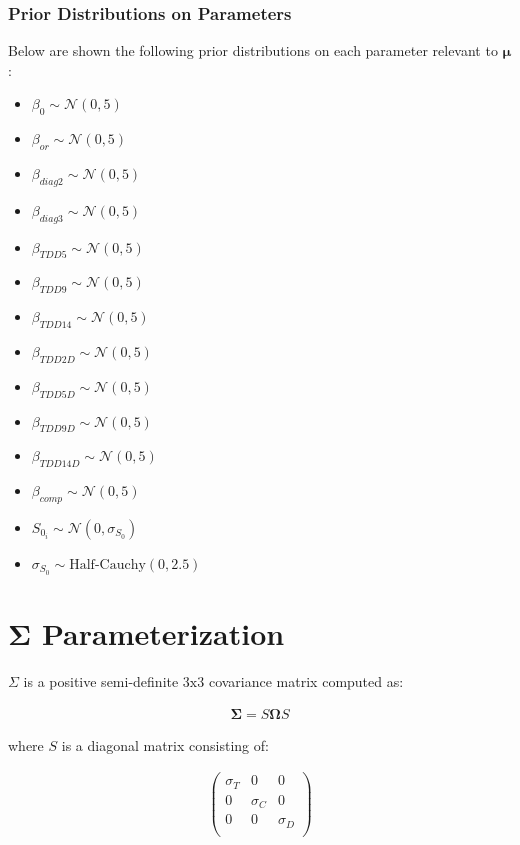 \subsubsection{Prior Distributions on Parameters}
Below are shown the following prior distributions on each parameter relevant to $\boldsymbol{\mu}$:
\begin{itemize}
    \item $\beta_{0} \sim \mathcal{N}(0,5)$
    \item $\beta_{or} \sim \mathcal{N}(0,5)$
    \item $\beta_{diag2} \sim \mathcal{N}(0,5)$
    \item $\beta_{diag3} \sim \mathcal{N}(0,5)$
    \item $\beta_{TDD5} \sim \mathcal{N}(0,5)$
    \item $\beta_{TDD9} \sim \mathcal{N}(0,5)$
    \item $\beta_{TDD14} \sim \mathcal{N}(0,5)$
    \item $\beta_{TDD2D} \sim \mathcal{N}(0,5)$
    \item $\beta_{TDD5D} \sim \mathcal{N}(0,5)$
    \item $\beta_{TDD9D} \sim \mathcal{N}(0,5)$
    \item $\beta_{TDD14D} \sim \mathcal{N}(0,5)$
    \item $\beta_{comp} \sim \mathcal{N}(0,5)$
    \item $S_{0_i} \sim \mathcal{N}(0,\sigma_{S_0})$
    \item $\sigma_{S_0} \sim \text{Half-Cauchy}(0, 2.5)$
\end{itemize}

\section{$\boldsymbol{\Sigma}$ Parameterization}
$\Sigma$ is a positive semi-definite $3\text{x}3$ covariance matrix computed as:

\begin{align}
   \boldsymbol{\Sigma}=S\boldsymbol{\Omega}S
   \label{eqn:Sigma}
\end{align}

where $S$ is a diagonal matrix consisting of: 

\begin{align}
   \begin{pmatrix}
      \sigma_{T} & 0 & 0 \\
      0 & \sigma_{C} & 0 \\
      0 & 0 & \sigma_{D} \\
   \end{pmatrix}
   \label{eqn:S}
\end{align}

